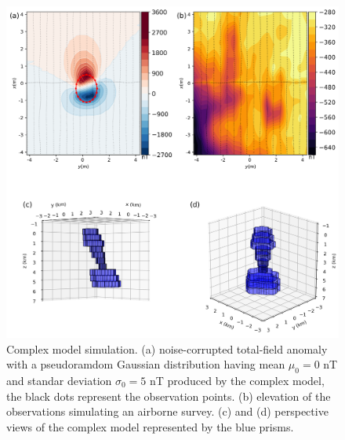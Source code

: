 \begin{figure}
    \centering
    \includegraphics[scale=.5]{figures/complex_model_data.png}
    \caption{Complex model simulation. (a) noise-corrupted total-field anomaly with a pseudoramdom Gaussian distribution having mean $\mu_0 = 0$ nT and standar deviation $\sigma_0 = 5$ nT produced by the complex model, the black dots represent the observation points. (b) elevation of the observations simulating an airborne survey. (c) and (d) perspective views of the complex model represented by the blue prisms.
}
    \label{fig:complex_model}
\end{figure}

